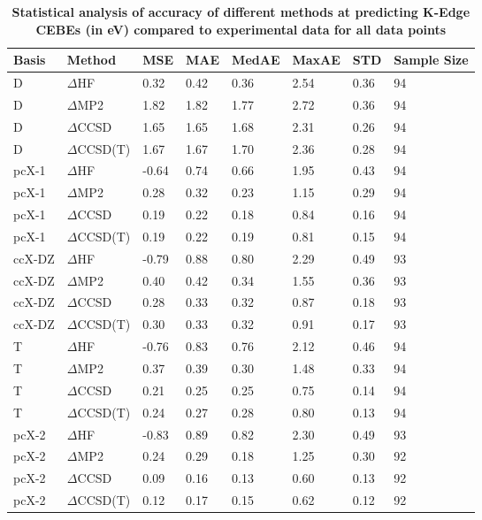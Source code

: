 \begin{table}
  \caption{\textbf{Statistical analysis of accuracy of different methods at predicting K-Edge CEBEs (in eV) compared to experimental data for all data points}}
  \label{tbl:method-all-summary}
  \begin{tabular}{l l l l l l l l }
    \toprule
    \textbf{Basis} & \textbf{Method} & \textbf{MSE} & \textbf{MAE} & \textbf{MedAE} & \textbf{MaxAE} & \textbf{STD} & \textbf{Sample Size} \\ 
    \midrule
    D & $\Delta$HF & 0.32 & 0.42 & 0.36 & 2.54 & 0.36 & 94 \\ 
    D & $\Delta$MP2 & 1.82 & 1.82 & 1.77 & 2.72 & 0.36 & 94 \\ 
    D & $\Delta$CCSD & 1.65 & 1.65 & 1.68 & 2.31 & 0.26 & 94 \\ 
    D & $\Delta$CCSD(T) & 1.67 & 1.67 & 1.70 & 2.36 & 0.28 & 94 \\ 
    pcX-1 & $\Delta$HF & -0.64 & 0.74 & 0.66 & 1.95 & 0.43 & 94 \\ 
    pcX-1 & $\Delta$MP2 & 0.28 & 0.32 & 0.23 & 1.15 & 0.29 & 94 \\ 
    pcX-1 & $\Delta$CCSD & 0.19 & 0.22 & 0.18 & 0.84 & 0.16 & 94 \\ 
    pcX-1 & $\Delta$CCSD(T) & 0.19 & 0.22 & 0.19 & 0.81 & 0.15 & 94 \\ 
    ccX-DZ & $\Delta$HF & -0.79 & 0.88 & 0.80 & 2.29 & 0.49 & 93 \\ 
    ccX-DZ & $\Delta$MP2 & 0.40 & 0.42 & 0.34 & 1.55 & 0.36 & 93 \\ 
    ccX-DZ & $\Delta$CCSD & 0.28 & 0.33 & 0.32 & 0.87 & 0.18 & 93 \\ 
    ccX-DZ & $\Delta$CCSD(T) & 0.30 & 0.33 & 0.32 & 0.91 & 0.17 & 93 \\ 
    T & $\Delta$HF & -0.76 & 0.83 & 0.76 & 2.12 & 0.46 & 94 \\ 
    T & $\Delta$MP2 & 0.37 & 0.39 & 0.30 & 1.48 & 0.33 & 94 \\ 
    T & $\Delta$CCSD & 0.21 & 0.25 & 0.25 & 0.75 & 0.14 & 94 \\ 
    T & $\Delta$CCSD(T) & 0.24 & 0.27 & 0.28 & 0.80 & 0.13 & 94 \\ 
    pcX-2 & $\Delta$HF & -0.83 & 0.89 & 0.82 & 2.30 & 0.49 & 93 \\ 
    pcX-2 & $\Delta$MP2 & 0.24 & 0.29 & 0.18 & 1.25 & 0.30 & 92 \\ 
    pcX-2 & $\Delta$CCSD & 0.09 & 0.16 & 0.13 & 0.60 & 0.13 & 92 \\ 
    pcX-2 & $\Delta$CCSD(T) & 0.12 & 0.17 & 0.15 & 0.62 & 0.12 & 92 \\ 

\end{tabular}
\end{table}
